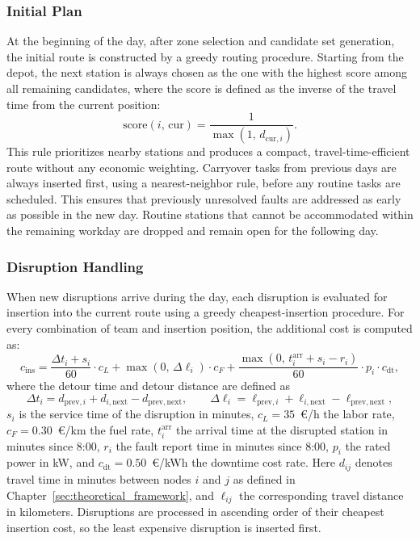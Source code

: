 \documentclass[12pt,oneside]{article}
\begin{document}
\subsubsection*{Initial Plan}
At the beginning of the day, after zone selection and candidate set generation, the initial route is constructed by a greedy routing procedure. Starting from the depot, the next station is always chosen as the one with the highest score among all remaining candidates, where the score is defined as the inverse of the travel time from the current position:
\[
  \text{score}(i,\, \mathrm{cur}) = \frac{1}{\max(1,\, d_{\mathrm{cur},i})}.
\]
This rule prioritizes nearby stations and produces a compact, travel-time-efficient route without any economic weighting. Carryover tasks from previous days are always inserted first, using a nearest-neighbor rule, before any routine tasks are scheduled. This ensures that previously unresolved faults are addressed as early as possible in the new day. Routine stations that cannot be accommodated within the remaining workday are dropped and remain open for the following day.

\subsubsection*{Disruption Handling}
When new disruptions arrive during the day, each disruption is evaluated for insertion into the current route using a greedy cheapest-insertion procedure. For every combination of team and insertion position, the additional cost is computed as:
\[
  c_{\mathrm{ins}} = \frac{\Delta t_i + s_i}{60} \cdot c_L
  + \max(0,\, \Delta \ell_i) \cdot c_F
  + \frac{\max(0,\, t_i^{\mathrm{arr}} + s_i - r_i)}{60} \cdot p_i \cdot c_{\mathrm{dt}},
\]
where the detour time and detour distance are defined as
\[
  \Delta t_i = d_{\mathrm{prev},i} + d_{i,\mathrm{next}} - d_{\mathrm{prev},\mathrm{next}}, \qquad
  \Delta \ell_i = \ell_{\mathrm{prev},i} + \ell_{i,\mathrm{next}} - \ell_{\mathrm{prev},\mathrm{next}},
\]
$s_i$ is the service time of the disruption in minutes, $c_L = 35$~€/h the labor rate, $c_F = 0.30$~€/km the fuel rate, $t_i^{\mathrm{arr}}$ the arrival time at the disrupted station in minutes since 8:00, $r_i$ the fault report time in minutes since 8:00, $p_i$ the rated power in kW, and $c_{\mathrm{dt}} = 0.50$~€/kWh the downtime cost rate. Here $d_{ij}$ denotes travel time in minutes between nodes $i$ and $j$ as defined in Chapter~\ref{sec:theoretical_framework}, and $\ell_{ij}$ the corresponding travel distance in kilometers. Disruptions are processed in ascending order of their cheapest insertion cost, so the least expensive disruption is inserted first.
\end{document}
